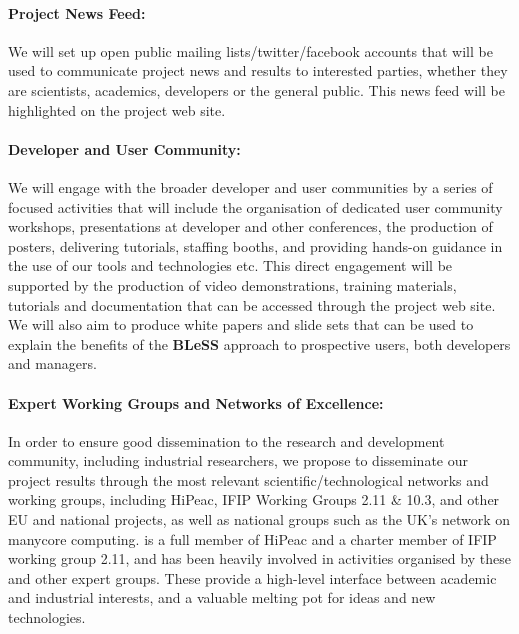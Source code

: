 \documentclass[a4paper,11pt]{article}
\newcommand{\project}[1]{\textbf{#1}\xspace}
\newcommand{\BLESS}{\project{BLeSS}}
\newcommand{\TheProject}{\BLESS}
\begin{document}
\paragraph{Project News Feed:}  We will set up open public mailing lists/twitter/facebook accounts that will
be used to communicate project news and results to interested parties, whether they are scientists, academics, developers
or the general public.  This news feed will be highlighted on the project web site.

\paragraph{Developer and User Community:} We will engage with the broader
developer and user communities by a series of focused activities
that will include the organisation of dedicated user community workshops, presentations at
 developer and other conferences, 
 the production of posters, delivering tutorials, staffing booths, and providing hands-on
 guidance in the use of our tools and technologies etc.  This direct engagement will be
 supported by the production of video demonstrations, training materials, tutorials and documentation that can
 be accessed through the project web site.  We will also aim to produce white papers and slide sets that
 can be used to explain the benefits of the \TheProject{} approach to prospective users, both developers
 and managers.
 
\paragraph{Expert Working Groups and Networks of Excellence:}
In order to ensure good dissemination to the research and development
community, including industrial researchers, we propose to disseminate
our project results through the most relevant scientific/technological
networks and working groups, including HiPeac,%
IFIP Working Groups 2.11 \& 10.3, and other EU and national projects,
as well as national groups such as the UK's network on manycore computing.
\SAshort{} is a full member of HiPeac and a charter member of IFIP working
group 2.11, and has been heavily involved in activities organised by these and other expert groups.
These provide a high-level interface between academic and industrial interests, and a valuable
melting pot for ideas and new technologies. 
\end{document}
